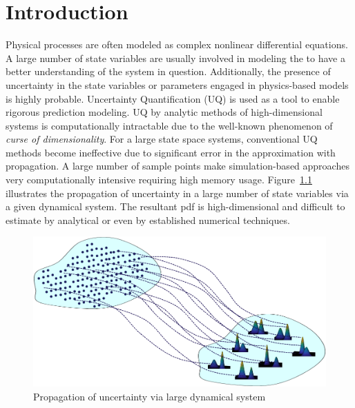 \chapter{Introduction}

Physical processes are often modeled as complex nonlinear differential equations. A large number of state variables are usually involved in modeling the to have a better understanding of the system in question. Additionally, the presence of uncertainty in the state variables or parameters engaged in physics-based models is highly probable. Uncertainty Quantification (UQ) is used as a tool to enable rigorous prediction modeling. UQ by analytic methods of high-dimensional systems is computationally intractable due to the well-known phenomenon of \textit{curse of dimensionality}. For a large state space systems, conventional UQ methods become ineffective due to significant error in the approximation with propagation. A large number of sample points make simulation-based approaches very computationally intensive requiring high memory usage. Figure~\ref{uncp} illustrates the propagation of uncertainty in a large number of state variables via a given dynamical system. The resultant pdf is high-dimensional and difficult to estimate by analytical or even by established numerical techniques. 


\begin{figure}[H]
\centering
\includegraphics[width=\textwidth]{intr_figs/uncp}
\caption{Propagation of uncertainty via large dynamical system}
\label{uncp}
\end{figure}

